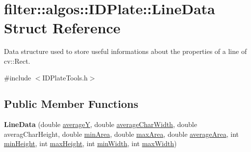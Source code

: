 \hypertarget{structfilter_1_1algos_1_1_i_d_plate_1_1_line_data}{}\section{filter\+:\+:algos\+:\+:I\+D\+Plate\+:\+:Line\+Data Struct Reference}
\label{structfilter_1_1algos_1_1_i_d_plate_1_1_line_data}


Data structure used to store useful informations about the properties of a line of cv\+::\+Rect.  




{\ttfamily \#include $<$I\+D\+Plate\+Tools.\+h$>$}

\subsection*{Public Member Functions}
\begin{DoxyCompactItemize}
\item 
\mbox{\label{structfilter_1_1algos_1_1_i_d_plate_1_1_line_data_a5db0bc6a4612f8bf9daa48a414500a7b}} 
{\bfseries Line\+Data} (double \hyperlink{structfilter_1_1algos_1_1_i_d_plate_1_1_line_data_a118538e641ee7bb9eb840c3f1808def1}{averageY}, double \hyperlink{structfilter_1_1algos_1_1_i_d_plate_1_1_line_data_a8e1c5201e974a31d4e22ea3636fb6e33}{average\+Char\+Width}, double averag\+Char\+Height, double \hyperlink{structfilter_1_1algos_1_1_i_d_plate_1_1_line_data_aa3408ca5252584f2c6ea41d7ec958b2d}{min\+Area}, double \hyperlink{structfilter_1_1algos_1_1_i_d_plate_1_1_line_data_a99b4ae093de0bc21064181c009b20145}{max\+Area}, double \hyperlink{structfilter_1_1algos_1_1_i_d_plate_1_1_line_data_aa00e50f6bc1585b0629eb2ca81619ffb}{average\+Area}, int \hyperlink{structfilter_1_1algos_1_1_i_d_plate_1_1_line_data_a5d00389d0bb89ce4233225208dbd2f1c}{min\+Height}, int \hyperlink{structfilter_1_1algos_1_1_i_d_plate_1_1_line_data_a200d4e45cc7821a296d80719df6c02ae}{max\+Height}, int \hyperlink{structfilter_1_1algos_1_1_i_d_plate_1_1_line_data_a3cefd935775064665f685f52370334a4}{min\+Width}, int \hyperlink{structfilter_1_1algos_1_1_i_d_plate_1_1_line_data_aade8f2d536b7faf9298726c5c4edcb4e}{max\+Width})
\end{DoxyCompactItemize}

